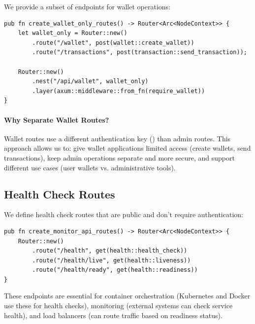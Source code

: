 We provide a subset of endpoints for wallet operations:

\begin{listing}[htbp]
\caption{Wallet-only routes with separate authentication}
\label{lst:wallet-routes}
\begin{verbatim}
pub fn create_wallet_only_routes() -> Router<Arc<NodeContext>> {
    let wallet_only = Router::new()
        .route("/wallet", post(wallet::create_wallet))
        .route("/transactions", post(transaction::send_transaction));

    Router::new()
        .nest("/api/wallet", wallet_only)
        .layer(axum::middleware::from_fn(require_wallet))
}
\end{verbatim}
\end{listing}

\paragraph{Why Separate Wallet Routes?}
Wallet routes use a different authentication key () than admin routes. This approach allows us to: give wallet applications limited access (create wallets, send transactions), keep admin operations separate and more secure, and support different use cases (user wallets vs. administrative tools).

\subsection{Health Check Routes}

We define health check routes that are public and don't require authentication:

\begin{listing}[htbp]
\caption{Public health check endpoints}
\label{lst:health-routes}
\begin{verbatim}
pub fn create_monitor_api_routes() -> Router<Arc<NodeContext>> {
    Router::new()
        .route("/health", get(health::health_check))
        .route("/health/live", get(health::liveness))
        .route("/health/ready", get(health::readiness))
}
\end{verbatim}
\end{listing}

These endpoints are essential for container orchestration (Kubernetes and Docker use these for health checks), monitoring (external systems can check service health), and load balancers (can route traffic based on readiness status).

